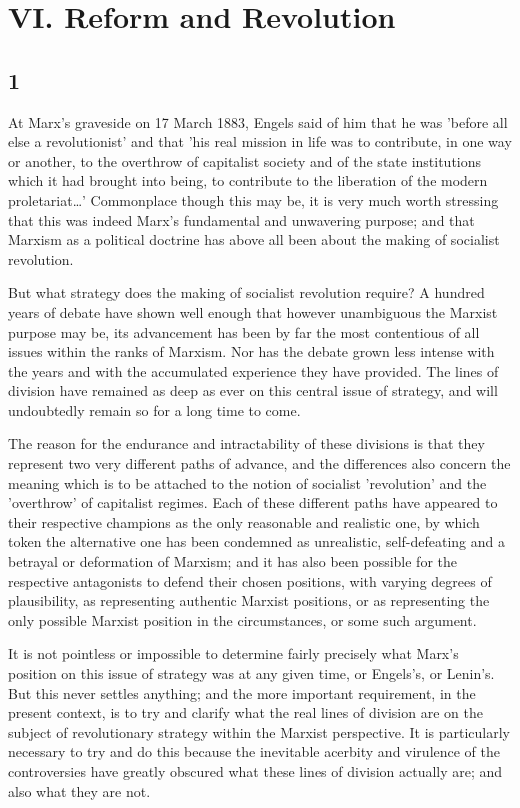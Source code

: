 \chapter*{VI. Reform and Revolution}


\section*{1}
At Marx's graveside on 17 March 1883, Engels said of him that he was 'before all else a revolutionist' and that 'his real mission in life was to contribute, in one way or another, to the overthrow of capitalist society and of the state institutions which it had brought into being, to contribute to the liberation of the modern proletariat\dots' Commonplace though this may be, it is very much worth stressing that this was indeed Marx's fundamental and unwavering purpose; and that Marxism as a political doctrine has above all been about the making of socialist revolution.

But what strategy does the making of socialist revolution require? A hundred years of debate have shown well enough that however unambiguous the Marxist purpose may be, its advancement has been by far the most contentious of all issues within the ranks of Marxism. Nor has the debate grown less intense with the years and with the accumulated experience they have provided. The lines of division have remained as deep as ever on this central issue of strategy, and will undoubtedly remain so for a long time to come.

The reason for the endurance and intractability of these divisions is that they represent two very different paths of advance, and the differences also concern the meaning which is to be attached to the notion of socialist 'revolution' and the 'overthrow' of capitalist regimes. Each of these different paths have appeared to their respective champions as the only reasonable and realistic one, by which token the alternative one has been condemned as unrealistic, self-defeating and a betrayal or deformation of Marxism; and it has also been possible for the respective antagonists to defend their chosen positions, with varying degrees of plausibility, as representing authentic Marxist positions, or as representing the only possible Marxist position in the circumstances, or some such argument.

It is not pointless or impossible to determine fairly precisely what Marx's position on this issue of strategy was at any given time, or Engels's, or Lenin's. But this never settles anything; and  the more important requirement, in the present context, is to try and clarify what the real lines of division are on the subject of revolutionary strategy within the Marxist perspective. It is particularly necessary to try and do this because the inevitable acerbity and virulence of the controversies have greatly obscured what these lines of division actually are; and also what they are not.

